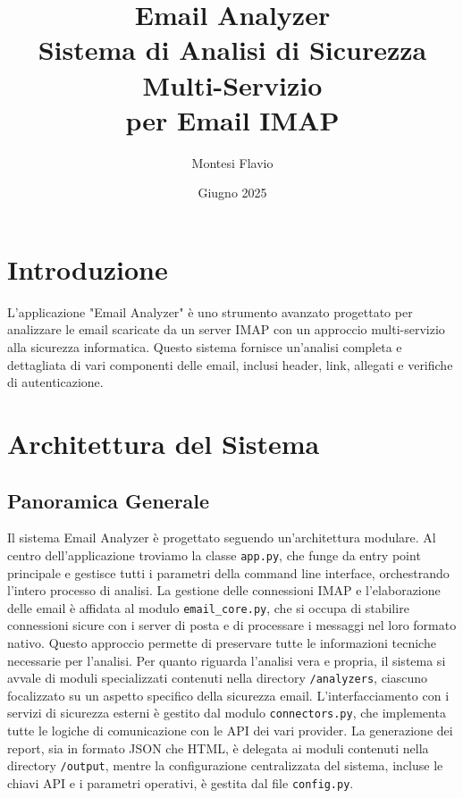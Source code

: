\documentclass{article}
\title{Email Analyzer\\Sistema di Analisi di Sicurezza Multi-Servizio\\per Email IMAP}
\author{Montesi Flavio}
\date{Giugno 2025}
\begin{document}
\maketitle 
\tableofcontents
\newpage

\section{Introduzione}

L'applicazione "Email Analyzer" è uno strumento avanzato progettato per analizzare le email scaricate da un server IMAP con un approccio multi-servizio alla sicurezza informatica. Questo sistema fornisce un'analisi completa e dettagliata di vari componenti delle email, inclusi header, link, allegati e verifiche di autenticazione.

\section{Architettura del Sistema}

\subsection{Panoramica Generale}

Il sistema Email Analyzer è progettato seguendo un'architettura modulare. Al centro dell'applicazione troviamo la classe \texttt{app.py}, che funge da entry point principale e gestisce tutti i parametri della command line interface, orchestrando l'intero processo di analisi.
\newline\newline La gestione delle connessioni IMAP e l'elaborazione delle email è affidata al modulo \texttt{email\_core.py}, che si occupa di stabilire connessioni sicure con i server di posta e di processare i messaggi nel loro formato nativo. Questo approccio permette di preservare tutte le informazioni tecniche necessarie per l'analisi.
\newline\newline
Per quanto riguarda l'analisi vera e propria, il sistema si avvale di moduli specializzati contenuti nella directory \texttt{/analyzers}, ciascuno focalizzato su un aspetto specifico della sicurezza email. L'interfacciamento con i servizi di sicurezza esterni è gestito dal modulo \texttt{connectors.py}, che implementa tutte le logiche di comunicazione con le API dei vari provider.
\newline\newline
La generazione dei report, sia in formato JSON che HTML, è delegata ai moduli contenuti nella directory \texttt{/output}, mentre la configurazione centralizzata del sistema, incluse le chiavi API e i parametri operativi, è gestita dal file \texttt{config.py}.
\end{document}
